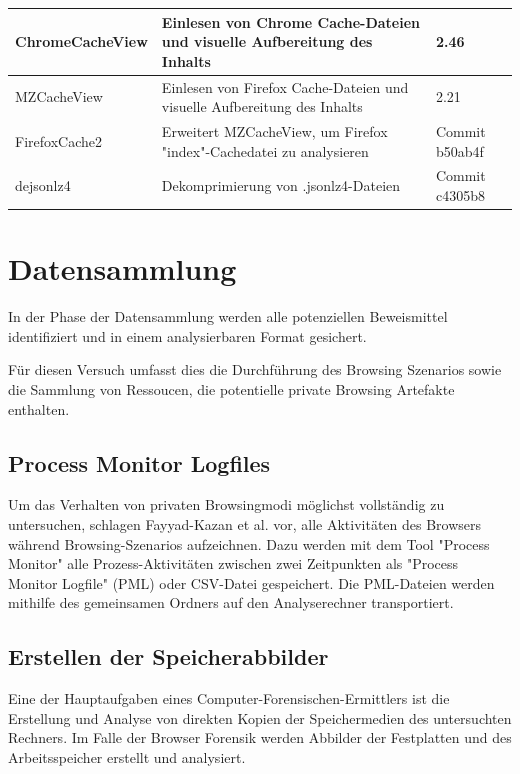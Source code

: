 \begin{table}[]
{\begin{tabular}{|l|l|l|}
ChromeCacheView                         & Einlesen von Chrome Cache-Dateien und visuelle Aufbereitung des Inhalts          & 2.46                                  \\ \hline
MZCacheView                             & Einlesen von Firefox Cache-Dateien und visuelle Aufbereitung des Inhalts         & 2.21                                  \\ \hline
FirefoxCache2                           & Erweitert MZCacheView, um Firefox "index"-Cachedatei zu analysieren              & Commit b50ab4f                        \\ \hline
dejsonlz4                               & Dekomprimierung von .jsonlz4-Dateien                                             & Commit c4305b8                        \\ \hline
\end{tabular}
}
\end{table}


\section{Datensammlung}
In der Phase der Datensammlung werden alle potenziellen Beweismittel identifiziert und in einem analysierbaren Format gesichert.\cite{Izzati.2022}

Für diesen Versuch umfasst dies die Durchführung des Browsing Szenarios sowie die Sammlung von Ressoucen, die potentielle private Browsing Artefakte enthalten.

\subsection*{Process Monitor Logfiles}
Um das Verhalten von privaten Browsingmodi möglichst vollständig zu untersuchen, schlagen Fayyad-Kazan et al. \cite{Fayyad.2021} vor, alle Aktivitäten des Browsers während Browsing-Szenarios aufzeichnen.
Dazu werden mit dem Tool "Process Monitor" alle Prozess-Aktivitäten zwischen zwei Zeitpunkten als "Process Monitor Logfile" (PML) oder CSV-Datei gespeichert. \cite{Fayyad.2021, Rochmadi.2017}
Die PML-Dateien werden mithilfe des gemeinsamen Ordners auf den Analyserechner transportiert.

\subsection*{Erstellen der Speicherabbilder}
Eine der Hauptaufgaben eines Computer-Forensischen-Ermittlers ist die Erstellung und Analyse von direkten Kopien der Speichermedien des untersuchten Rechners. \cite{Hassan.2019}
Im Falle der Browser Forensik werden Abbilder der Festplatten und des Arbeitsspeicher erstellt und analysiert.

